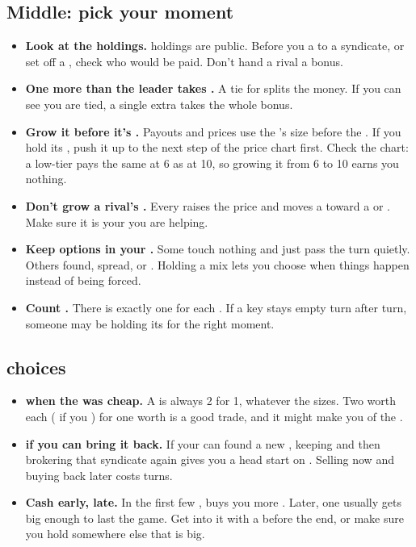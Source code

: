 \subsection{Middle: pick your moment}
\begin{itemize}
  \item \textbf{Look at the holdings.}  holdings are public. Before you  a  to a syndicate, or set off a
    , check who would be paid. Don't hand a rival a bonus.
  \item \textbf{One  more than the leader takes .} A tie for  splits the money. If you can see you are tied,
    a single extra  takes the whole  bonus.
  \item \textbf{Grow it before it's .} Payouts and  prices use the  's size before the
    . If you hold its , push it up to the next step of the price chart first. Check the chart: a low-tier
     pays the same at 6  as at 10, so growing it from 6 to 10 earns you nothing.
  \item \textbf{Don't grow a rival's .} Every  raises the price and moves a  toward a  or
    . Make sure it is your  you are helping.
  \item \textbf{Keep options in your .} Some  touch nothing and just pass the turn quietly. Others found, spread,
    or . Holding a mix lets you choose when things happen instead of being forced.
  \item \textbf{Count .} There is exactly one  for each . If a key  stays empty turn after turn,
    someone may be holding its  for the right moment.
\end{itemize}

\subsection{ choices}
\begin{itemize}
  \item \textbf{ when the   was cheap.} A  is always 2 for 1, whatever the sizes. Two 
    worth  each ( if you ) for one worth  is a good trade, and it might make you  of the
    .
  \item \textbf{ if you can bring it back.} If your  can found a new , keeping   and then
    brokering that syndicate again gives you a head start on . Selling now and buying back later costs turns.
  \item \textbf{Cash early,  late.} In the first few ,  buys you more . Later, one  usually
    gets big enough to last the game. Get into it with a  before the end, or make sure you hold  somewhere else that is big.
\end{itemize}

